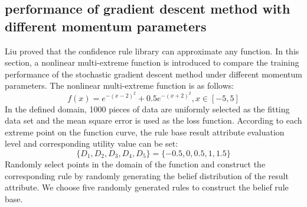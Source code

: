 \documentclass{ieeeaccess}
\begin{document}
\subsection{performance of gradient descent method with different momentum parameters}
Liu\cite{a16} proved that the confidence rule library can approximate any function.
In this section, a nonlinear multi-extreme function is introduced to compare the training performance of the stochastic gradient descent method under different momentum parameters.
The nonlinear multi-extreme function is as follows:
$$f(x)=e^{-(x-2)^2}+0.5e^{-(x+2)^2},x\in[-5,5]$$
In the defined domain, 1000 pieces of data are uniformly selected as the fitting data set and the mean square error is used as the loss function.
According to each extreme point on the function curve, the rule base result attribute evaluation level and corresponding utility value can be set:
$$\{D_1,D_2,D_3,D_4,D_5\}=\{-0.5,0,0.5,1,1.5\}$$
Randomly select points in the domain of the function and construct the corresponding rule by randomly generating the belief distribution of the result attribute.
We choose five randomly generated rules to construct the belief rule base.
\end{document}

